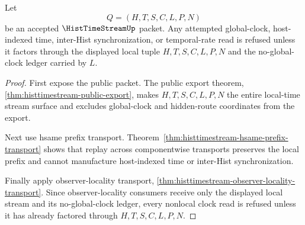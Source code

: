 \begin{theorem}
\label{thm:histtimestream-local-clock-refusal}
Let
$$
Q=(H,T,S,C,L,P,N)
$$
be an accepted $\HistTimeStreamUp$ packet. Any attempted global-clock, host-indexed time, inter-Hist synchronization, or temporal-rate read is refused unless it factors through the displayed local tuple $H,T,S,C,L,P,N$ and the no-global-clock ledger carried by $L$.
\end{theorem}
\begin{proof}
First expose the public packet. The public export theorem, \autoref{thm:histtimestream-public-export}, makes $H,T,S,C,L,P,N$ the entire local-time stream surface and excludes global-clock and hidden-route coordinates from the export.

Next use hsame prefix transport. Theorem~\ref{thm:histtimestream-hsame-prefix-transport} shows that replay across componentwise transports preserves the local prefix and cannot manufacture host-indexed time or inter-Hist synchronization.

Finally apply observer-locality transport, \autoref{thm:histtimestream-observer-locality-transport}. Since observer-locality consumers receive only the displayed local stream and its no-global-clock ledger, every nonlocal clock read is refused unless it has already factored through $H,T,S,C,L,P,N$.
\end{proof}

